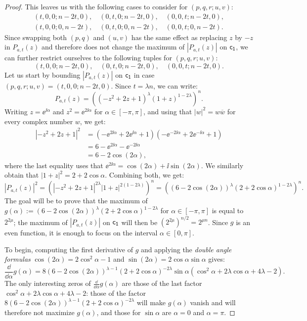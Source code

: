 \documentclass[11pt]{llncs}
\begin{document}
\begin{proof}
   This leaves us with the following cases to consider for $(p,q,r;u,v)$:
    \begin{gather*}
        (t,0,0;n-2t,0),\quad(0,t,0;n-2t,0),\quad(0,0,t;n-2t,0),\\
         (t,0,0;0,n-2t),\quad(0,t,0;0,n-2t),\quad(0,0,t;0,n-2t).
    \end{gather*}
    Since swapping both $(p,q)$ and $(u,v)$ has the same effect as replacing $z$ by $-z$ in $P_{a,t}(z)$ and therefore does not change the maximum of $|P_{a,t}(z)|$ on $\mathsf{c_1}$, we can further restrict ourselves to the following tuples for $(p,q,r;u,v)$:
    \[
        (t,0,0;n-2t,0),\quad(0,t,0;n-2t,0),\quad(0,0,t;n-2t,0).
    \]
    Let us start by bounding $|P_{a,t}(z)|$ on $\mathsf{c_1}$ in case $(p,q,r;u,v)=(t,0,0;n-2t,0)$. Since $t=\lambda n$, we can write:
    \[
        P_{a,t}(z)=\left((-z^2+2z+1)^{\lambda}(1+z)^{1-2\lambda}\right)^n.
    \]
    Writing $z=\ee^{\ii\alpha}$ and $z^2=\ee^{2\ii\alpha}$ for $\alpha\in[-\pi,\pi]$, and using that $|w|^2=w\overline w$ for every complex number $w$, we get:
    \begin{align*}
        |-z^2+2z+1|^2&=\left(-\ee^{2\ii\alpha}+2\ee^{\ii\alpha}+1\right)\left(-\ee^{-2\ii\alpha}+2\ee^{-\ii\alpha}+1\right)\\
        &=6-\ee^{2\ii\alpha}-\ee^{-2\ii\alpha}\\
        &=6-2\cos (2\alpha),
    \end{align*}
    where the last equality uses that $\ee^{2\ii\alpha}=\cos(2\alpha)+\ii\sin(2\alpha)$. We similarly obtain that $|1+z|^2=2+2\cos\alpha$. Combining both, we get:   
    \[
        |P_{a,t}(z)|^2=\left(\left|-z^2+2z+1\right|^{2\lambda}|1+z|^{2(1-2\lambda)}\right)^n=\left((6-2\cos(2\alpha))^\lambda(2+2\cos\alpha)^{1-2\lambda}\right)^n.
    \]
    The goal will be to prove that the maximum of $g(\alpha):=(6-2\cos(2\alpha))^\lambda(2+2\cos\alpha)^{1-2\lambda}$ for $\alpha\in[-\pi,\pi]$ is equal to $2^{2\mu}$; the maximum of $|P_{a,t}(z)|$ on $\mathsf{c_1}$ will then be $\left(2^{2\mu}\right)^{n/2}=2^{\mu n}$. Since $g$ is an even function, it is enough to focus on the interval $\alpha\in[0,\pi]$.

    To begin, computing the first derivative of $g$ and applying the \textit{double angle formulas} $\cos(2\alpha)=2\cos^2\alpha-1$ and $\sin(2\alpha)=2\cos\alpha\sin\alpha$ gives:
    \[
        \frac{\dd}{\dd\alpha}g(\alpha)=8(6-2\cos(2\alpha))^{\lambda-1}(2+2\cos\alpha)^{-2\lambda}\sin\alpha\left(\cos^2\alpha+2\lambda\cos\alpha+4\lambda-2\right).
    \]
    The only interesting zeros of $\frac{\dd}{\dd\alpha}g(\alpha)$ are those of the last factor 
    $\cos^2\alpha+2\lambda\cos\alpha+4\lambda-2$: those of the factor $8(6-2\cos(2\alpha))^{\lambda-1}(2+2\cos\alpha)^{-2\lambda}$ will make $g(\alpha)$ vanish and will therefore not maximize $g(\alpha)$, and those for $\sin\alpha$ are $\alpha=0$ and $\alpha=\pi$.
    

\end{proof}
\end{document}
